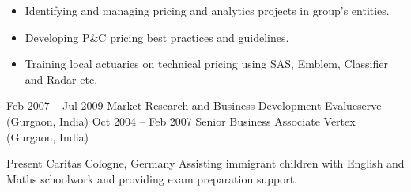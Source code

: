 \documentclass[a4paper,]{fortysecondscv}
\begin{document}
\begin{cvtable}
{        \begin{itemize}[nosep, leftmargin=0pt] %
            \item Identifying and managing pricing and analytics projects in group's entities.
            \item Developing P\&C pricing best practices and guidelines.
            \item Training local actuaries on technical pricing using SAS, Emblem, Classifier and Radar etc.
        \end{itemize}
    }
    \vspace{\topsep}
    \cvitem
    {Feb 2007 -- Jul 2009}
    {Market Research and Business Development}
    {Evalueserve (Gurgaon, India)}
    {
    }
    \vspace{\topsep}
    \cvitem
    {Oct 2004 -- Feb 2007}
    {Senior Business Associate}
    {Vertex (Gurgaon, India)}
    {
    }
\end{cvtable}


\begin{cvtable}[1.1]
    \vspace{\topsep}
    \cvitem
    {Present}
    {Caritas}
    {Cologne, Germany}
    {Assisting immigrant children with English and Maths schoolwork and providing exam preparation support.}
\end{cvtable}




\end{document}
